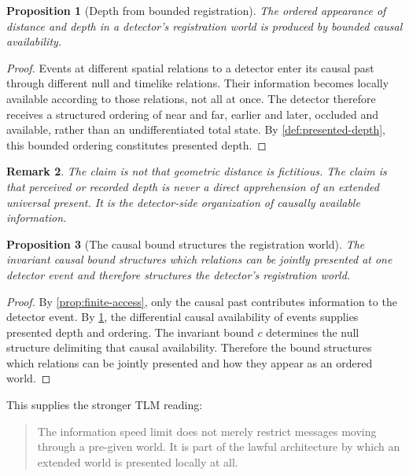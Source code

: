 \documentclass[12pt,onecolumn]{article}
\newtheorem{proposition}{Proposition}[section]
\newtheorem{remark}[proposition]{Remark}
\begin{document}
\begin{proposition}[Depth from bounded registration]
\label{prop:depth}
The ordered appearance of distance and depth in a detector's registration world is produced by bounded causal availability.
\end{proposition}

\begin{proof}
Events at different spatial relations to a detector enter its causal past through different null and timelike relations. Their information becomes locally available according to those relations, not all at once. The detector therefore receives a structured ordering of near and far, earlier and later, occluded and available, rather than an undifferentiated total state. By \cref{def:presented-depth}, this bounded ordering constitutes presented depth.
\end{proof}

\begin{remark}
The claim is not that geometric distance is fictitious. The claim is that perceived or recorded depth is never a direct apprehension of an extended universal present. It is the detector-side organization of causally available information.
\end{remark}

\begin{proposition}[The causal bound structures the registration world]
\label{prop:world-structure}
The invariant causal bound structures which relations can be jointly presented at one detector event and therefore structures the detector's registration world.
\end{proposition}

\begin{proof}
By \cref{prop:finite-access}, only the causal past contributes information to the detector event. By \cref{prop:depth}, the differential causal availability of events supplies presented depth and ordering. The invariant bound \(c\) determines the null structure delimiting that causal availability. Therefore the bound structures which relations can be jointly presented and how they appear as an ordered world.
\end{proof}

This supplies the stronger TLM reading:

\begin{quote}
The information speed limit does not merely restrict messages moving through a pre-given world. It is part of the lawful architecture by which an extended world is presented locally at all.
\end{quote}
\end{document}
